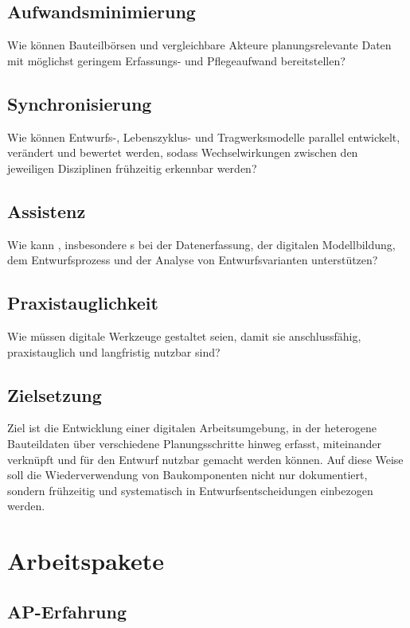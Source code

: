 \documentclass[type=zwischenbericht]{zukunftbau}
\begin{document}
\subsection{Aufwandsminimierung}
Wie können Bauteilbörsen und vergleichbare Akteure planungsrelevante Daten mit möglichst geringem Erfassungs- und Pflegeaufwand bereitstellen?

\subsection{Synchronisierung}
Wie können Entwurfs-, Lebenszyklus- und Tragwerksmodelle parallel entwickelt, verändert und bewertet werden, sodass Wechselwirkungen zwischen den jeweiligen Disziplinen frühzeitig erkennbar werden?

\subsection{Assistenz}
Wie kann , insbesondere s bei der Datenerfassung, der digitalen Modellbildung, dem Entwurfsprozess und der Analyse von Entwurfsvarianten unterstützen?

\subsection{Praxistauglichkeit}
Wie müssen digitale Werkzeuge gestaltet seien, damit sie anschlussfähig, praxistauglich und langfristig nutzbar sind?

\subsection{Zielsetzung}
Ziel ist die Entwicklung einer digitalen Arbeitsumgebung, in der heterogene Bauteildaten über verschiedene Planungsschritte hinweg erfasst, miteinander verknüpft und für den Entwurf nutzbar gemacht werden können. Auf diese Weise soll die Wiederverwendung von Baukomponenten nicht nur dokumentiert, sondern frühzeitig und systematisch in Entwurfsentscheidungen einbezogen werden.

\section{Arbeitspakete}

\subsection{AP-Erfahrung}
\end{document}
